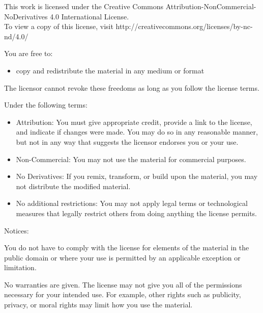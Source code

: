 \footnotesize
\begin{center}
{\Large \ccbyncnd}

\vspace{2em}
This work is licensed under the Creative Commons
Attribution-NonCommercial-NoDerivatives 4.0 International License.\\To
view a copy of this license, visit
http://creativecommons.org/licenses/by-nc-nd/4.0/
\end{center}

You are free to:

\begin{itemize}
\item copy and redistribute the material in any medium or format 
\end{itemize}


The licensor cannot revoke these freedoms as long as you follow the
license terms.

Under the following terms:

\begin{itemize}
\item Attribution: You must give appropriate credit, provide a link to 
the
license, and indicate if changes were made. You may do so in any
reasonable manner, but not in any way that suggests the licensor
endorses you or your use. 

\item Non-Commercial: You may not use the material for commercial 
purposes.

\item No Derivatives: If you remix, transform, or build upon the
material, you may not distribute the modified material.

\item No additional restrictions: You may not apply legal terms or
technological measures that legally restrict others from doing anything
the license permits.
\end{itemize}

Notices:

You do not have to comply with the license for elements of the material
in the public domain or where your use is permitted by an applicable
exception or limitation.

No warranties are given. The license may not give you all of the
permissions necessary for your intended use. For example, other rights
such as publicity, privacy, or moral rights may limit how you use the
material. 



